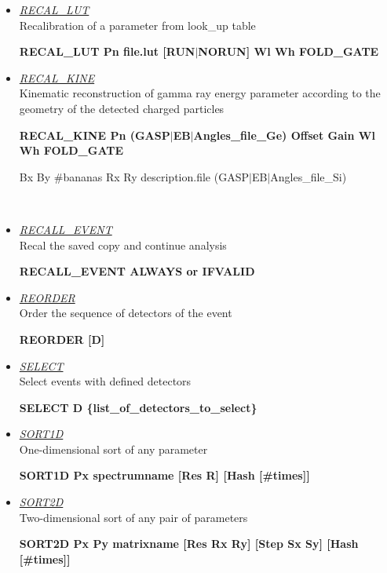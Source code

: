 \begin{itemize}
 \item	{\it\underline{RECAL\_LUT}} \\
	{\sc Recalibration of a parameter from look\_up table}

	\smallskip
	{\bf RECAL\_LUT Pn file.lut [RUN$|$NORUN] Wl Wh FOLD\_GATE} \\

 \item	{\it\underline{RECAL\_KINE}} \\
	{\sc Kinematic reconstruction of gamma ray energy parameter according 
	to the geometry of the detected charged particles }

	\smallskip
	{\bf RECAL\_KINE Pn (GASP$|$EB$|$Angles\_file\_Ge) Offset Gain Wl Wh 
	FOLD\_GATE 

	\hskip1cm Bx By \#bananas Rx Ry description.file
		  (GASP$|$EB$|$Angles\_file\_Si)} \\

 \item	{\it\underline{RECALL\_EVENT}} \\
	{\sc Recal the saved copy and continue analysis}

	\smallskip
	{\bf RECALL\_EVENT  ALWAYS or IFVALID} \\

 \item	{\it\underline{REORDER}} \\
	{\sc Order the sequence of detectors of the event	}

	\smallskip
	{\bf REORDER [D]} \\

 \item	{\it\underline{SELECT}} \\
	{\sc Select events with defined detectors}

	\smallskip
	{\bf SELECT D \{list\_of\_detectors\_to\_select\}} \\

 \item	{\it\underline{SORT1D}} \\
	{\sc One-dimensional sort of any parameter	}

	\smallskip
	{\bf SORT1D Px spectrumname [Res R] [Hash [\#times]]} \\

 \item	{\it\underline{SORT2D}} \\
	{\sc Two-dimensional sort of any pair of parameters	}

	\smallskip
	{\bf SORT2D Px Py matrixname [Res Rx Ry] [Step Sx Sy] [Hash 
	[\#times]]} \\


\end{itemize}
